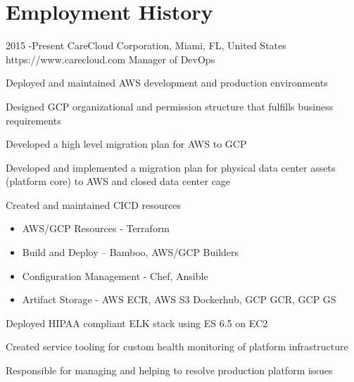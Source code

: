 \documentclass[10pt]{article} %
\begin{document}
\section{Employment History}

\job
{2015 -}{Present}
{CareCloud Corporation, Miami, FL, United States}
{https://www.carecloud.com}
{Manager of DevOps}
{\begin{itemize-noindent}
\item{Deployed and maintained AWS development and production environments}
\item{Designed GCP organizational and permission structure that fulfills business requirements}
\item{Developed a high level migration plan for AWS to GCP}
\item{Developed and implemented a migration plan for physical data center assets (platform core) to AWS and closed data center cage}
\item{Created and maintained CICD resources}
\begin{itemize}
\item{AWS/GCP Resources - Terraform}
\item{Build and Deploy – Bamboo, AWS/GCP Builders}
\item{Configuration Management - Chef, Ansible}
\item{Artifact Storage - AWS ECR, AWS S3 Dockerhub, GCP GCR, GCP GS}
\end{itemize}
\item{Deployed HIPAA compliant ELK stack using ES 6.5 on EC2}
\item{Created service tooling for custom health monitoring of platform infrastructure}
\item{Responsible for managing and helping to resolve production platform issues}
\end{itemize-noindent}}

\end{document}
